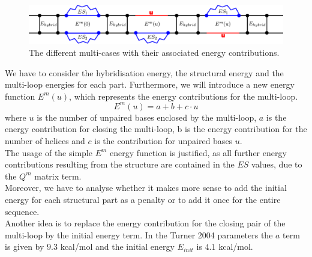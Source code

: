 \documentclass[11pt,a4paper]{report}
\begin{document}
\begin{figure}[H]
\centering
\includegraphics[scale=0.6]{Energy2.pdf}
\caption{The different multi-cases with their associated energy contributions.}
\end{figure}
\noindent
We have to consider the hybridisation energy, the structural energy and the multi-loop energies for each part. 
Furthermore, we will introduce a new energy function $E^m (u)$, which represents the energy contributions for the multi-loop.
\begin{equation*}
E^m(u) = a + b + c\cdot u
\end{equation*}
where $u$ is the number of unpaired bases enclosed by the multi-loop, $a$ is the energy contribution for closing the multi-loop, b is the energy contribution for the number of helices and $c$ is the contribution for unpaired bases $u$.\\
The usage of the simple $E^m$ energy function is justified, as all further energy contributions resulting from the structure are contained in the $ES$ values, due to the $Q^m$ matrix term.\\
Moreover, we have to analyse whether it makes more sense to add the initial energy for each structural part as a penalty or to add it once for the entire sequence.\\
Another idea is to replace the energy contribution for the closing pair of the multi-loop by the initial energy term. In the Turner 2004 parameters the $a$ term is given by $9.3$ kcal/mol and the initial energy $E_{init}$ is $4.1$ kcal/mol.
\end{document}
